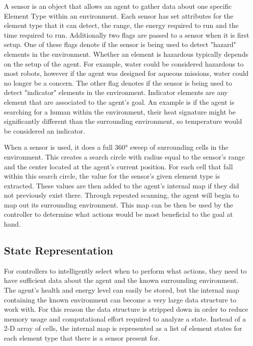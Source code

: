 A sensor is an object that allows an agent to gather data about one specific Element Type within an environment.
Each sensor has set attributes for the element type that it can detect, the range, the energy required to run and the time required to run.
Additionally two flags are passed to a sensor when it is first setup.
One of these flags denote if the sensor is being used to detect "hazard" elements in the environment.
Whether an element is hazardous typically depends on the setup of the agent.
For example, water could be considered hazardous to most robots, however if the agent was designed for aqueous missions, water could no longer be a concern.
The other flag denotes if the sensor is being used to detect "indicator" elements in the environment.
Indicator elements are any element that are associated to the agent's goal.
An example is if the agent is searching for a human within the environment, their heat signature might be significantly different than the surrounding environment, so temperature would be considered an indicator.

When a sensor is used, it does a full 360° sweep of surrounding cells in the environment.
This creates a search circle with radius equal to the sensor's range and the center located at the agent's current position.
For each cell that fall within this search circle, the value for the sensor's given element type is extracted.
These values are then added to the agent's internal map if they did not previously exist there.
Through repeated scanning, the agent will begin to map out its surrounding environment.
This map can be then be used by the controller to determine what actions would be most beneficial to the goal at hand.

\subsection{State Representation}
For controllers to intelligently select when to perform what actions, they need to have sufficient data about the agent and the known surrounding environment.
The agent's health and energy level can easily be stored, but the internal map containing the known environment can become a very large data structure to work with.
For this reason the data structure is stripped down in order to reduce memory usage and computational effort required to analyze a state.
Instead of a 2-D array of cells,  the internal map is represented as a list of element states for each element type that there is a sensor present for.

